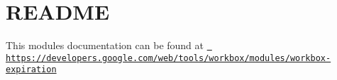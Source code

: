 \chapter{README}
\hypertarget{md_pkiclassroomrescheduler_2src_2main_2frontend_2node__modules_2workbox-expiration_2_r_e_a_d_m_e}{}\label{md_pkiclassroomrescheduler_2src_2main_2frontend_2node__modules_2workbox-expiration_2_r_e_a_d_m_e}
This module\textquotesingle{}s documentation can be found at \href{https://developers.google.com/web/tools/workbox/modules/workbox-expiration}{\texttt{ https\+://developers.\+google.\+com/web/tools/workbox/modules/workbox-\/expiration}} 